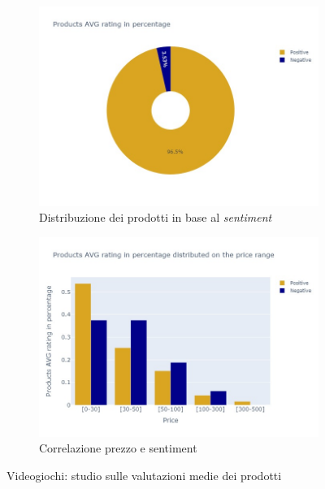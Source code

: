 				\begin{figure} [h]
					\centering
					\begin{subfigure}{0.48\textwidth}
						\includegraphics[width=\textwidth]{Figure/pie_videogames}
						\caption{Distribuzione dei prodotti in base al \textit{sentiment}}
						\label{fig:pie_videogames}
					\end{subfigure}
					\begin{subfigure}{0.48\textwidth}
						\includegraphics[width=\textwidth]{Figure/priceVSrating_videogames}
						\caption{Correlazione prezzo e sentiment}
						\label{fig:priceVSrating_videogames}
					\end{subfigure}
					\caption{Videogiochi: studio sulle valutazioni medie dei prodotti}\label{fig:price_raiting_videogames}
				\end{figure}
		
